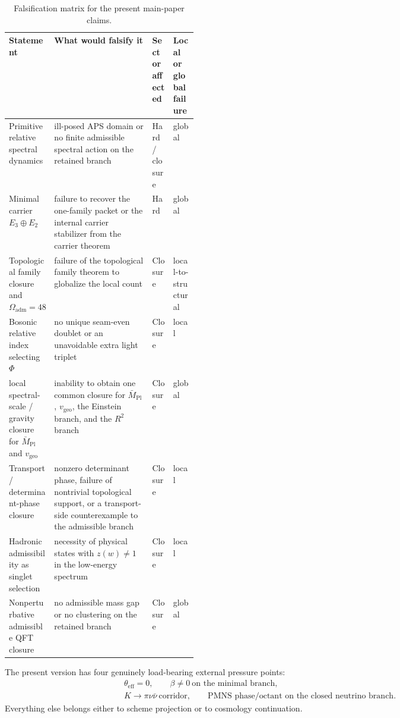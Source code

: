 \documentclass[11pt,a4paper]{article}
\theoremstyle{definition}
\theoremstyle{remark}
\newcommand{\Mpl}{\bar M_{\mathrm{Pl}}}
\newcommand{\Oadm}{\Omega_{\mathrm{adm}}}
\newcommand{\vgeo}{v_{\mathrm{geo}}}
\begin{document}
\begin{table}[t]
\centering
\small
\begin{tabularx}{\linewidth}{@{}>{\raggedright\arraybackslash}p{0.24\linewidth}YY>{\raggedright\arraybackslash}p{0.13\linewidth}@{}}
\toprule
Statement & What would falsify it & Sector affected & Local or global failure \\
\midrule
Primitive relative spectral dynamics & ill-posed APS domain or no finite admissible spectral action on the retained branch & Hard / closure & global \\
Minimal carrier $E_3\oplus E_2$ & failure to recover the one-family packet or the internal carrier stabilizer from the carrier theorem & Hard & global \\
Topological family closure and $\Oadm=48$ & failure of the topological family theorem to globalize the local count & Closure & local-to-structural \\
Bosonic relative index selecting $\Phi$ & no unique seam-even doublet or an unavoidable extra light triplet & Closure & local \\
local spectral-scale / gravity closure for $\Mpl$ and $\vgeo$ & inability to obtain one common closure for $\Mpl$, $\vgeo$, the Einstein branch, and the $R^2$ branch & Closure & global \\
Transport / determinant-phase closure & nonzero determinant phase, failure of nontrivial topological support, or a transport-side counterexample to the admissible branch & Closure & local \\
Hadronic admissibility as singlet selection & necessity of physical states with $z(w)\neq1$ in the low-energy spectrum & Closure & local \\
Nonperturbative admissible QFT closure & no admissible mass gap or no clustering on the retained branch & Closure & global \\
\bottomrule
\end{tabularx}
\caption{Falsification matrix for the present main-paper claims.}
\label{tab:falsification}
\end{table}

\begin{tcolorbox}[colback=blue!2, colframe=blue!50!black, breakable,
    title={Hard kill rows of the present version}, colbacktitle=blue!60!black]
The present version has four genuinely load-bearing external pressure points:
\[
\begin{aligned}
\theta_{\mathrm{eff}}=0,
\qquad
\beta\neq 0\ \text{on the minimal branch},\\
K\to\pi\nu\bar\nu\ \text{corridor},
\qquad
\text{PMNS phase/octant on the closed neutrino branch}.
\end{aligned}
\]
Everything else belongs either to scheme projection or to cosmology continuation.
\end{tcolorbox}
\end{document}
